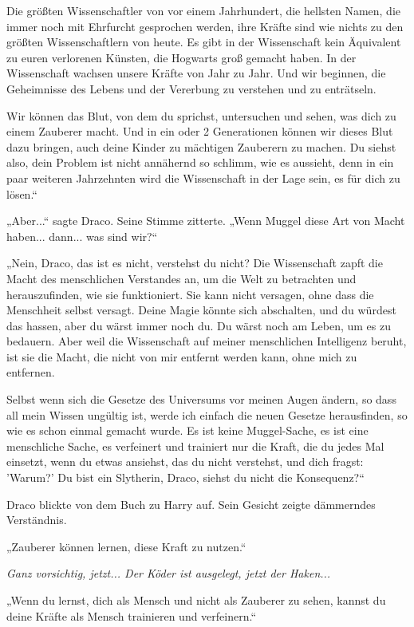 {Die größten Wissenschaftler von vor einem Jahrhundert, die hellsten Namen, die immer noch mit Ehrfurcht gesprochen werden, ihre Kräfte sind wie nichts zu den größten Wissenschaftlern von heute. Es gibt in der Wissenschaft kein Äquivalent zu euren verlorenen Künsten, die Hogwarts groß gemacht haben. In der Wissenschaft wachsen unsere Kräfte von Jahr zu Jahr. Und wir beginnen, die Geheimnisse des Lebens und der Vererbung zu verstehen und zu enträtseln.

Wir können das Blut, von dem du sprichst, untersuchen und sehen, was dich zu einem Zauberer macht. Und in ein oder 2 Generationen können wir dieses Blut dazu bringen, auch deine Kinder zu mächtigen Zauberern zu machen. Du siehst also, dein Problem ist nicht annähernd so schlimm, wie es aussieht, denn in ein paar weiteren Jahrzehnten wird die Wissenschaft in der Lage sein, es für dich zu lösen.“

„Aber...“ sagte Draco. Seine Stimme zitterte. „Wenn Muggel diese Art von Macht haben... dann... was sind wir?“

„Nein, Draco, das ist es nicht, verstehst du nicht? Die Wissenschaft zapft die Macht des menschlichen Verstandes an, um die Welt zu betrachten und herauszufinden, wie sie funktioniert. Sie kann nicht versagen, ohne dass die Menschheit selbst versagt. Deine Magie könnte sich abschalten, und du würdest das hassen, aber du wärst immer noch du. Du wärst noch am Leben, um es zu bedauern. Aber weil die Wissenschaft auf meiner menschlichen Intelligenz beruht, ist sie die Macht, die nicht von mir entfernt werden kann, ohne mich zu entfernen.

Selbst wenn sich die Gesetze des Universums vor meinen Augen ändern, so dass all mein Wissen ungültig ist, werde ich einfach die neuen Gesetze herausfinden, so wie es schon einmal gemacht wurde. Es ist keine Muggel-Sache, es ist eine menschliche Sache, es verfeinert und trainiert nur die Kraft, die du jedes Mal einsetzt, wenn du etwas ansiehst, das du nicht verstehst, und dich fragst: 'Warum?' Du bist ein Slytherin, Draco, siehst du nicht die Konsequenz?“

Draco blickte von dem Buch zu Harry auf. Sein Gesicht zeigte dämmerndes Verständnis.

„Zauberer können lernen, diese Kraft zu nutzen.“

\emph{Ganz vorsichtig, jetzt... Der Köder ist ausgelegt, jetzt der Haken...}

„Wenn du lernst, dich als Mensch und nicht als Zauberer zu sehen, kannst du deine Kräfte als Mensch trainieren und verfeinern.“

}
